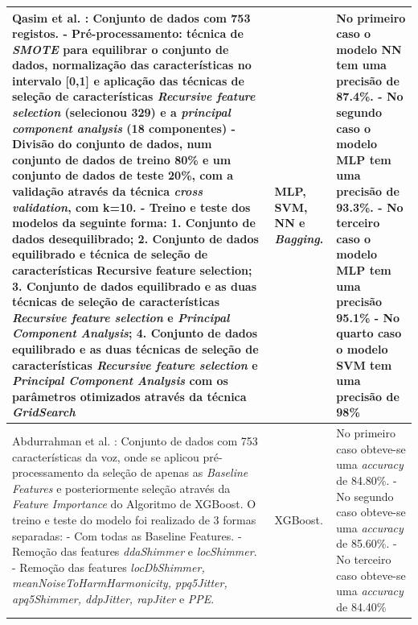 \documentclass[12pt,a4paper,twoside]{report}
\begin{document}
{\begin{longtable}{|p{6cm}|p{4cm}|p{6cm}|}
Qasim et al. \cite{medicina57111217}:
Conjunto de dados com 753 registos.
- Pré-processamento: técnica de \textit{SMOTE} para equilibrar o
conjunto de dados, normalização das características no
intervalo [0,1] e aplicação das técnicas de seleção de
características \textit{Recursive feature selection} (selecionou
329) e a \textit{principal component analysis} (18 componentes)
- Divisão do conjunto de dados, num conjunto de dados
de treino 80\% e um conjunto de dados de teste 20\%, com
a validação através da técnica \textit{cross validation}, com k=10.
- Treino e teste dos modelos da seguinte forma:
1. Conjunto de dados desequilibrado;
2. Conjunto de dados equilibrado e técnica de
seleção de características Recursive feature selection;
3. Conjunto de dados equilibrado e as duas
técnicas de seleção de características
\textit{Recursive feature selection} e \textit{Principal Component Analysis};
4. Conjunto de dados equilibrado e as duas
técnicas de seleção de características
\textit{Recursive feature selection} e \textit{Principal
Component Analysis} com os parâmetros
otimizados através da técnica \textit{GridSearch}
& \Gls{MLP}, \gls{SVM}, \gls{NN} e \textit{Bagging}.
& No primeiro caso o modelo \gls{NN} tem uma precisão de 87.4\%.
- No segundo caso o modelo \gls{MLP} tem
uma precisão de 93.3\%.
- No terceiro caso o modelo
\gls{MLP} tem uma precisão 95.1\%
- No quarto caso o modelo
\Gls{SVM} tem
uma precisão de 98\% \\ \hline

Abdurrahman et al. \cite{Abdurrahman}:
Conjunto de dados com 753 características da voz, onde se aplicou
pré-processamento da seleção de apenas as \textit{Baseline Features}
e posteriormente seleção através da \textit{Feature Importance} do Algoritmo de \gls{XGBoost}.
O treino e teste do modelo foi realizado de 3 formas separadas:
- Com todas as Baseline Features.
-  Remoção das features \textit{ddaShimmer} e \textit{locShimmer}.
-  Remoção das features \textit{locDbShimmer, meanNoiseToHarmHarmonicity, ppq5Jitter, apq5Shimmer, ddpJitter, rapJiter} e \textit{PPE}.
& \gls{XGBoost}.
& No primeiro caso obteve-se
uma \textit{accuracy} de 84.80\%.
- No segundo caso obteve-se uma \textit{accuracy} de 85.60\%.
- No terceiro caso obteve-se uma \textit{accuracy} de 84.40\% \\ \hline


\end{longtable}}
\end{document}
